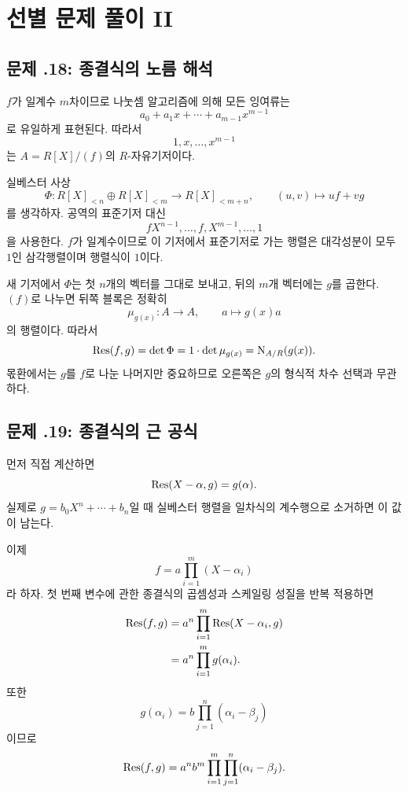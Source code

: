\section{선별 문제 풀이 II}
\label{sec:symmetric-discriminant-solutions-b}

\subsection*{문제 \thechapter.18: 종결식의 노름 해석}

\begin{solution}
$f$가 일계수 $m$차이므로 나눗셈 알고리즘에 의해 모든 잉여류는
\[
  a_0+a_1x+\cdots+a_{m-1}x^{m-1}
\]
로 유일하게 표현된다. 따라서
\[
  1,x,\dots,x^{m-1}
\]
는 $A=R[X]/(f)$의 $R$-자유기저이다.

실베스터 사상
\[
  \Phi:R[X]_{<n}\oplus R[X]_{<m}\to R[X]_{<m+n},
  \qquad (u,v)\mapsto uf+vg
\]
를 생각하자. 공역의 표준기저 대신
\[
  fX^{n-1},\dots,f,
  X^{m-1},\dots,1
\]
을 사용한다. $f$가 일계수이므로 이 기저에서 표준기저로 가는 행렬은 대각성분이 모두 $1$인 삼각행렬이며 행렬식이 $1$이다.

새 기저에서 $\Phi$는 첫 $n$개의 벡터를 그대로 보내고, 뒤의 $m$개 벡터에는 $g$를 곱한다. $(f)$로 나누면 뒤쪽 블록은 정확히
\[
  \mu_{g(x)}:A\to A,
  \qquad a\mapsto g(x)a
\]
의 행렬이다. 따라서
\[
  \operatorname{Res}(f,g)=\det\Phi
  =1\cdot\det\mu_{g(x)}
  =\operatorname N_{A/R}(g(x)).
\]
몫환에서는 $g$를 $f$로 나눈 나머지만 중요하므로 오른쪽은 $g$의 형식적 차수 선택과 무관하다.
\end{solution}

\subsection*{문제 \thechapter.19: 종결식의 근 공식}

\begin{solution}
먼저 직접 계산하면
\[
  \operatorname{Res}(X-\alpha,g)=g(\alpha).
\]
실제로 $g=b_0X^n+\cdots+b_n$일 때 실베스터 행렬을 일차식의 계수행으로 소거하면 이 값이 남는다.

이제
\[
  f=a\prod_{i=1}^m(X-\alpha_i)
\]
라 하자. 첫 번째 변수에 관한 종결식의 곱셈성과 스케일링 성질을 반복 적용하면
\[
\begin{aligned}
  \operatorname{Res}(f,g)
  &=a^n\prod_{i=1}^m\operatorname{Res}(X-\alpha_i,g)\\
  &=a^n\prod_{i=1}^m g(\alpha_i).
\end{aligned}
\]
또한
\[
  g(\alpha_i)
  =b\prod_{j=1}^n(\alpha_i-\beta_j)
\]
이므로
\[
  \operatorname{Res}(f,g)
  =a^n b^m
  \prod_{i=1}^m\prod_{j=1}^n
  (\alpha_i-\beta_j).
\]
\end{solution}

